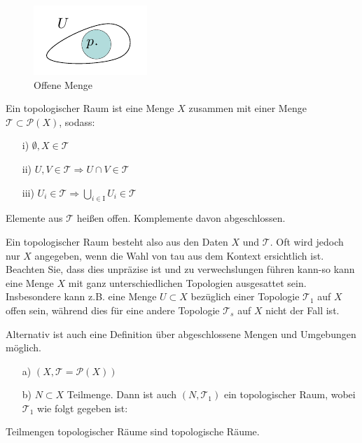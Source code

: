 \begin{figure}[H]
\centering
\includegraphics[scale=1.5]{figures/tikz/openset.pdf}
\caption{Offene Menge}
\label{img:offenemenge}
\end{figure} 

\begin{defs}
Ein topologischer Raum ist eine Menge $X$ zusammen mit einer Menge $\mathcal{T} \subset \mathcal{P}(X)$, sodass:
\begin{enumerate}
\item[i)] $\emptyset, X \in \mathcal{T}$
\item[ii)] $U, V \in \mathcal{T} \Rightarrow  U \cap V \in \mathcal{T}$
\item [iii)] $U_i \in \mathcal{T} \Rightarrow\bigcup\limits_{i \in \text{I}} U_i \in \mathcal{T}$
\end{enumerate} 
Elemente aus $\mathcal{T}$ heißen offen. 
Komplemente davon abgeschlossen.
\end{defs}

Ein topologischer Raum besteht also aus den Daten $X$ und $\mathcal{T}$.
Oft wird jedoch nur $X$ angegeben, wenn die Wahl von tau aus dem Kontext ersichtlich ist.
Beachten Sie, dass dies unpräzise ist und zu verwechslungen führen kann-so kann eine Menge $X$ mit ganz unterschiedlichen Topologien ausgesattet sein. 
Insbesondere kann z.B. eine Menge $U\subset X$ bezüglich einer Topologie $\mathcal{T}_1$ auf $X$ offen sein, während dies für eine andere Topologie $\mathcal{T}_s$ auf $X$
nicht der Fall ist.

\begin{bem}
Alternativ ist auch eine Definition über abgeschlossene Mengen und Umgebungen möglich.
\end{bem}

\begin{bsp}
\begin{enumerate}
	\item[a)] $( X, \mathcal{T} = \mathcal{P}(X) )$
	\item[b)] $N \subset X$ Teilmenge. Dann ist auch $(N,\mathcal{T}_1)$ ein topologischer Raum, wobei $\mathcal{T}_1$ wie folgt gegeben ist:\\
\end{enumerate}
Teilmengen topologischer Räume sind topologische Räume.
\end{bsp}

